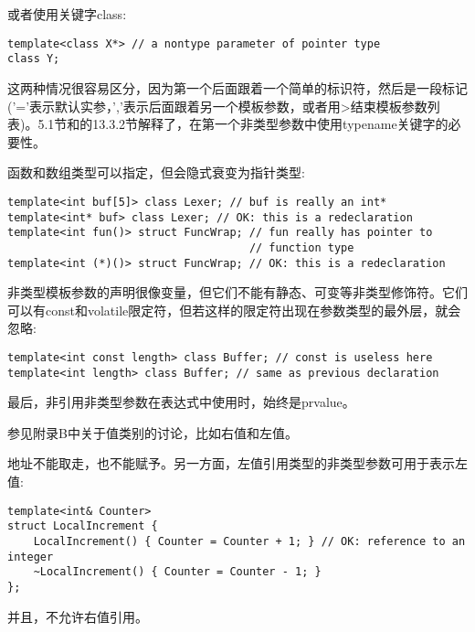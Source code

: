 或者使用关键字class:

\begin{lstlisting}[style=styleCXX]
template<class X*> // a nontype parameter of pointer type
class Y;
\end{lstlisting}

这两种情况很容易区分，因为第一个后面跟着一个简单的标识符，然后是一段标记('='表示默认实参，','表示后面跟着另一个模板参数，或者用>结束模板参数列表)。5.1节和的13.3.2节解释了，在第一个非类型参数中使用typename关键字的必要性。

函数和数组类型可以指定，但会隐式衰变为指针类型:

\begin{lstlisting}[style=styleCXX]
template<int buf[5]> class Lexer; // buf is really an int*
template<int* buf> class Lexer; // OK: this is a redeclaration
template<int fun()> struct FuncWrap; // fun really has pointer to
								     // function type
template<int (*)()> struct FuncWrap; // OK: this is a redeclaration
\end{lstlisting}

非类型模板参数的声明很像变量，但它们不能有静态、可变等非类型修饰符。它们可以有const和volatile限定符，但若这样的限定符出现在参数类型的最外层，就会忽略:

\begin{lstlisting}[style=styleCXX]
template<int const length> class Buffer; // const is useless here
template<int length> class Buffer; // same as previous declaration
\end{lstlisting}

最后，非引用非类型参数在表达式中使用时，始终是prvalue。 

\begin{tcolorbox}[colback=webgreen!5!white,colframe=webgreen!75!black]
\hspace*{0.75cm}参见附录B中关于值类别的讨论，比如右值和左值。
\end{tcolorbox}

地址不能取走，也不能赋予。另一方面，左值引用类型的非类型参数可用于表示左值:

\begin{lstlisting}[style=styleCXX]
template<int& Counter>
struct LocalIncrement {
	LocalIncrement() { Counter = Counter + 1; } // OK: reference to an integer
	~LocalIncrement() { Counter = Counter - 1; }
};
\end{lstlisting}

并且，不允许右值引用。


